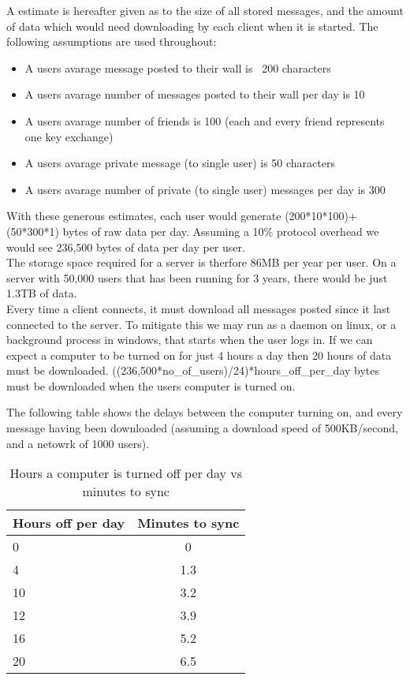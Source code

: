 A estimate is hereafter given as to the size of all stored messages, and the
amount of data which would need downloading by each client when it is started.
The following assumptions are used throughout:
\begin{itemize}
\item A users avarage message posted to their wall is ~200 characters
\item A users avarage number of messages posted to their wall per day is 10
\item A users avarage number of friends is 100 (each and every friend represents
one key exchange)
\item A users avarage private message (to single user) is 50 characters
\item A users avarage number of private (to single user) messages per day is 300
\end{itemize}
With these generous estimates, each user would generate (200*10*100)+(50*300*1)
bytes of raw data per day. Assuming a 10\% protocol overhead we would see
236,500 bytes of data per day per user.\\

The storage space required for a server is therfore 86MB per year per user. On a
server with 50,000 users that has been running for 3 years, there would be just
1.3TB of data.\\

Every time a client connects, it must download all messages posted since it last
connected to the server. To mitigate this we may run as a daemon on linux, or a
background process in windows, that starts when the user logs in. If we can
expect a computer to be turned on for just 4 hours a day then 20 hours of data
must be downloaded. ((236,500*no\_of\_users)/24)*hours\_off\_per\_day bytes must
be downloaded when the users computer is turned on.

The following table shows the delays between the computer turning on, and every
message having been downloaded (assuming a download speed of 500KB/second, and a
netowrk of 1000 users).

\begin{table}[h]
    \centering
    \begin{tabular}{lc}
    Hours off per day & Minutes to sync       \\ \hline
    0                 &  0 \\
    4                 &  1.3\\
    10                &  3.2\\
    12                &  3.9\\
    16                &  5.2\\
    20                &  6.5\\
    \end{tabular}
    \caption{Hours a computer is turned off per day vs minutes to sync}
\end{table}

